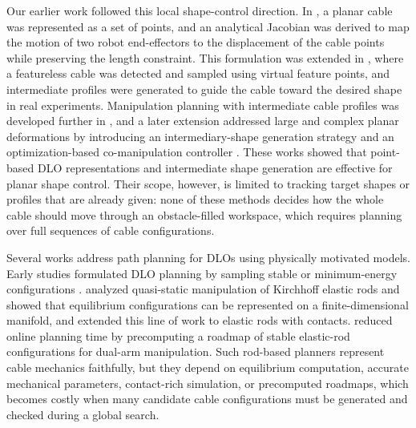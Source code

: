 \documentclass{pas}
\begin{document}
Our earlier work followed this local shape-control direction. In
\citet{AlmaghoutKlimchik2022PlanarShapeControl}, a planar cable was represented as a
set of points, and an analytical Jacobian was derived to map the motion of two
robot end-effectors to the displacement of the cable points while preserving the
length constraint. This formulation was extended in
\citet{AlmaghoutKlimchik2022VFP}, where a featureless cable was
detected and sampled using virtual feature points, and intermediate profiles were
generated to guide the cable toward the desired shape in real experiments.
Manipulation planning with intermediate cable profiles was developed further in
\citet{AlmaghoutKlimchik2024CableShapeControl}, and a
later extension addressed large and complex planar deformations by introducing
an intermediary-shape generation strategy and an optimization-based
co-manipulation controller \citep{AlmaghoutCherubiniKlimchik2024LargeDeformation}. These works
showed that point-based DLO representations and intermediate shape generation
are effective for planar shape control. Their scope, however, is limited to
tracking target shapes or profiles that are already given: none of these methods
decides how the whole cable should move through an obstacle-filled workspace,
which requires planning over full sequences of cable configurations.

Several works address path planning for DLOs using physically motivated
models. Early studies formulated DLO planning by sampling stable or
minimum-energy configurations \citep{MollKavraki2006DLOPlanning}.
\citet{BretlMcCarthy2014ElasticRod} analyzed quasi-static manipulation of
Kirchhoff elastic rods and showed that equilibrium configurations can be
represented on a finite-dimensional manifold, and
\citet{RousselFernbachTaix2020ElasticRodContacts} extended this line of work to
elastic rods with contacts. \citet{sintov2020motion} reduced online planning
time by precomputing a roadmap of stable elastic-rod configurations for
dual-arm manipulation. Such rod-based planners represent cable mechanics
faithfully, but they depend on equilibrium computation, accurate mechanical
parameters, contact-rich simulation, or precomputed roadmaps, which becomes
costly when many candidate cable configurations must be generated and checked
during a global search.
\end{document}
